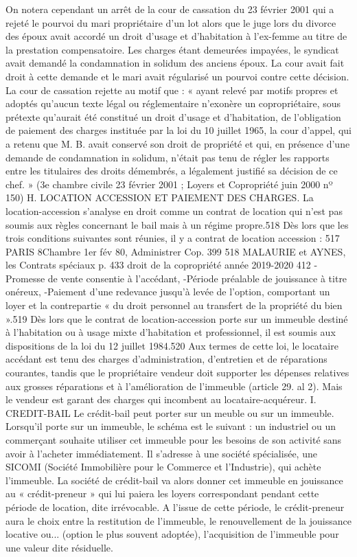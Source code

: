 On notera cependant un arrêt de la cour de cassation du 23 février 2001 qui a rejeté le pourvoi du mari propriétaire d'un lot alors que le juge lors du divorce des époux avait accordé un droit d'usage et d'habitation à l'ex-femme au titre de la prestation compensatoire. Les charges étant demeurées impayées, le syndicat avait demandé la condamnation in solidum des anciens époux. La cour avait fait droit à cette demande et le mari avait régularisé un pourvoi contre cette décision. La cour de cassation rejette au motif que : « ayant relevé par motifs propres et adoptés qu'aucun texte légal ou réglementaire n'exonère un copropriétaire, sous prétexte qu'aurait été constitué un droit d'usage et d'habitation, de l'obligation de paiement des charges instituée par la loi du 10 juillet 1965, la cour d'appel, qui a retenu que M. B. avait conservé son droit de propriété et qui, en présence d'une demande de condamnation in solidum, n'était pas tenu de régler les rapports entre les titulaires des droits démembrés, a légalement justifié sa décision de ce chef. » (3e chambre civile 23 février 2001 ; Loyers et Copropriété juin 2000 nº 150)
H. LOCATION ACCESSION ET PAIEMENT DES CHARGES.
La location-accession s’analyse en droit comme un contrat de location qui n’est pas soumis aux règles concernant le bail mais à un régime propre.518
Dès lors que les trois conditions suivantes sont réunies, il y a contrat de location accession :
517 PARIS 8\degres Chambre 1er fév 80, Administrer Cop. 399
518 MALAURIE et AYNES, les Contrats spéciaux p. 433 
droit de la copropriété année 2019-2020
412
- Promesse de vente consentie à l’accédant,
-Période préalable de jouissance à titre onéreux,
-Paiement d’une redevance jusqu’à levée de l’option, comportant un loyer et la contrepartie « du droit personnel au transfert de la propriété du bien ».519
Dès lors que le contrat de location-accession porte sur un immeuble destiné à l’habitation ou à usage mixte d’habitation et professionnel, il est soumis aux dispositions de la loi du 12 juillet 1984.520
Aux termes de cette loi, le locataire accédant est tenu des charges d'administration, d'entretien et de réparations courantes, tandis que le propriétaire vendeur doit supporter les dépenses relatives aux grosses réparations et à l'amélioration de l'immeuble (article 29. al 2). Mais le vendeur est garant des charges qui incombent au locataire-acquéreur.
I. CREDIT-BAIL
Le crédit-bail peut porter sur un meuble ou sur un immeuble.
Lorsqu’il porte sur un immeuble, le schéma est le suivant : un industriel ou un commerçant souhaite utiliser cet immeuble pour les besoins de son activité sans avoir à l’acheter immédiatement. Il s’adresse à une société spécialisée, une SICOMI (Société Immobilière pour le Commerce et l’Industrie), qui achète l’immeuble. La société de crédit-bail va alors donner cet immeuble en jouissance au « crédit-preneur » qui lui paiera les loyers correspondant pendant cette période de location, dite irrévocable. A l’issue de cette période, le crédit-preneur aura le choix entre la restitution de l’immeuble, le renouvellement de la jouissance locative ou... (option le plus souvent adoptée), l’acquisition de l’immeuble pour une valeur dite résiduelle.
